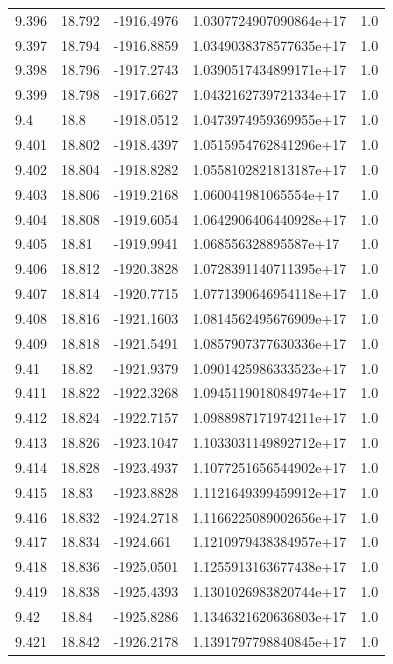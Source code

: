 \begin{tabular}{lllll}
9.396 & 18.792 & -1916.4976 & 1.0307724907090864e+17 & 1.0 \\
9.397 & 18.794 & -1916.8859 & 1.0349038378577635e+17 & 1.0 \\
9.398 & 18.796 & -1917.2743 & 1.0390517434899171e+17 & 1.0 \\
9.399 & 18.798 & -1917.6627 & 1.0432162739721334e+17 & 1.0 \\
9.4 & 18.8 & -1918.0512 & 1.0473974959369955e+17 & 1.0 \\
9.401 & 18.802 & -1918.4397 & 1.0515954762841296e+17 & 1.0 \\
9.402 & 18.804 & -1918.8282 & 1.0558102821813187e+17 & 1.0 \\
9.403 & 18.806 & -1919.2168 & 1.060041981065554e+17 & 1.0 \\
9.404 & 18.808 & -1919.6054 & 1.0642906406440928e+17 & 1.0 \\
9.405 & 18.81 & -1919.9941 & 1.068556328895587e+17 & 1.0 \\
9.406 & 18.812 & -1920.3828 & 1.0728391140711395e+17 & 1.0 \\
9.407 & 18.814 & -1920.7715 & 1.0771390646954118e+17 & 1.0 \\
9.408 & 18.816 & -1921.1603 & 1.0814562495676909e+17 & 1.0 \\
9.409 & 18.818 & -1921.5491 & 1.0857907377630336e+17 & 1.0 \\
9.41 & 18.82 & -1921.9379 & 1.0901425986333523e+17 & 1.0 \\
9.411 & 18.822 & -1922.3268 & 1.0945119018084974e+17 & 1.0 \\
9.412 & 18.824 & -1922.7157 & 1.0988987171974211e+17 & 1.0 \\
9.413 & 18.826 & -1923.1047 & 1.1033031149892712e+17 & 1.0 \\
9.414 & 18.828 & -1923.4937 & 1.1077251656544902e+17 & 1.0 \\
9.415 & 18.83 & -1923.8828 & 1.1121649399459912e+17 & 1.0 \\
9.416 & 18.832 & -1924.2718 & 1.1166225089002656e+17 & 1.0 \\
9.417 & 18.834 & -1924.661 & 1.1210979438384957e+17 & 1.0 \\
9.418 & 18.836 & -1925.0501 & 1.1255913163677438e+17 & 1.0 \\
9.419 & 18.838 & -1925.4393 & 1.1301026983820744e+17 & 1.0 \\
9.42 & 18.84 & -1925.8286 & 1.1346321620636803e+17 & 1.0 \\
9.421 & 18.842 & -1926.2178 & 1.1391797798840845e+17 & 1.0 \\

\end{tabular}
